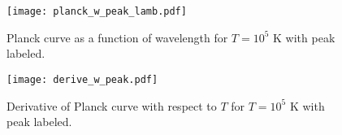 \documentclass[12pt]{article}
\begin{document}
\begin{figure}[b!]
\texttt{[image: planck\_w\_peak\_lamb.pdf]}
\caption{Planck curve as a function of wavelength for $T = 10^5$ K with peak labeled.}
\end{figure}

\begin{figure}[b!]
\texttt{[image: derive\_w\_peak.pdf]}
\caption{Derivative of Planck curve with respect to $T$ for $T = 10^5$ K with peak labeled.}
\end{figure}
\end{document}

